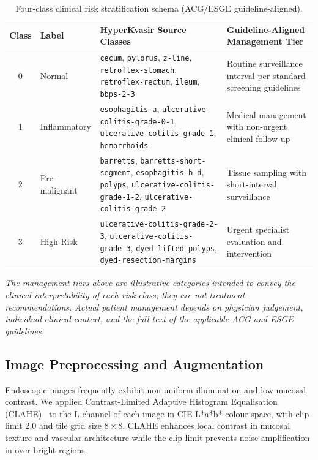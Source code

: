 \documentclass[11pt,a4paper]{article}
\begin{document}
\begin{table}[H]
\centering
\caption{Four-class clinical risk stratification schema (ACG/ESGE
  guideline-aligned).}
\label{tab:schema}
{\small
\begin{tabular}{clp{5.8cm}p{3.8cm}}
\toprule
\textbf{Class} & \textbf{Label} &
\textbf{HyperKvasir Source Classes} &
\textbf{Guideline-Aligned Management Tier}\\
\midrule
0 & Normal &
  \raggedright\texttt{cecum}, \texttt{pylorus}, \texttt{z-line},
  \texttt{retroflex-stomach}, \texttt{retroflex-rectum},
  \texttt{ileum}, \texttt{bbps-2-3}\arraybackslash &
  Routine surveillance interval per standard screening guidelines\\[2pt]
1 & Inflammatory &
  \raggedright\texttt{esophagitis-a},
  \texttt{ulcerative-colitis-grade-0-1},
  \texttt{ulcerative-colitis-grade-1},
  \texttt{hemorrhoids}\arraybackslash &
  Medical management with non-urgent clinical follow-up\\[2pt]
2 & Pre-malignant &
  \raggedright\texttt{barretts}, \texttt{barretts-short-segment},
  \texttt{esophagitis-b-d}, \texttt{polyps},
  \texttt{ulcerative-colitis-grade-1-2},
  \texttt{ulcerative-colitis-grade-2}\arraybackslash &
  Tissue sampling with short-interval surveillance\\[2pt]
3 & High-Risk &
  \raggedright\texttt{ulcerative-colitis-grade-2-3},
  \texttt{ulcerative-colitis-grade-3},
  \texttt{dyed-lifted-polyps},
  \texttt{dyed-resection-margins}\arraybackslash &
  Urgent specialist evaluation and intervention\\
\bottomrule
\end{tabular}}
\par\smallskip
{\footnotesize\textit{The management tiers above are illustrative categories
intended to convey the clinical interpretability of each risk class; they are
not treatment recommendations. Actual patient management depends on physician
judgement, individual clinical context, and the full text of the applicable
ACG and ESGE guidelines.}}
\end{table}

\subsection{Image Preprocessing and Augmentation}
\label{sec:preproc}

Endoscopic images frequently exhibit non-uniform illumination and low mucosal
contrast. We applied Contrast-Limited Adaptive Histogram Equalisation
(CLAHE)~\citep{Reza2004} to the L-channel of each image in CIE L*a*b* colour
space, with clip limit 2.0 and tile grid size $8\times8$. CLAHE enhances
local contrast in mucosal texture and vascular architecture while the clip
limit prevents noise amplification in over-bright regions.
\end{document}
